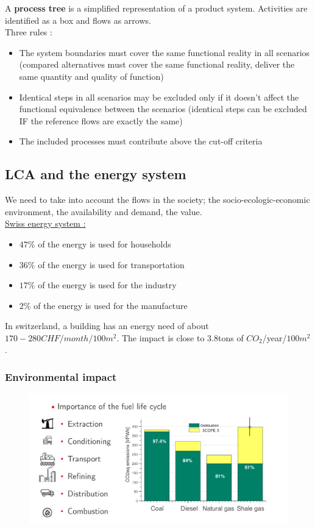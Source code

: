 \documentclass[../main.tex]{subfiles}
\begin{document}
A \textbf{process tree} is a simplified representation of a product system. Activities are identified as a box and flows as arrows. \\
Three rules : \begin{itemize}
    \item The system boundaries must cover the same functional reality in all scenarios (compared alternatives must cover the same functional reality, deliver the same quantity and quality of function)\\
    \item Identical steps in all scenarios may be excluded only if it doesn't affect the functional equivalence between the scenarios (identical steps can be excluded IF the reference flows are exactly the same)\\
    \item The included processes must contribute above the cut-off criteria\\
\end{itemize}

\subsection{LCA and the energy system}
We need to take into account the flows in the society; the socio-ecologic-economic environment, the availability and demand, the value.\\

\quad \underline{Swiss energy system :}\\
\begin{itemize}
    \item $47\%$ of the energy is used for households
    \item $36\%$ of the energy is used for transportation
    \item $17\%$ of the energy is used for the industry
    \item $2\%$ of the energy is used for the manufacture
\end{itemize}

In switzerland, a building has an energy need of about $170-280 CHF/month/100m^2$. The impact is close to $3.8$tons of $CO_2$/year/$100m^2$.\\

\subsubsection{Environmental impact}

\begin{figure}[hbt!]
    \centering
    \includegraphics[width=0.8\linewidth]{IMAGES/LCA/IMG_0181.jpeg}
\end{figure}
\end{document}
